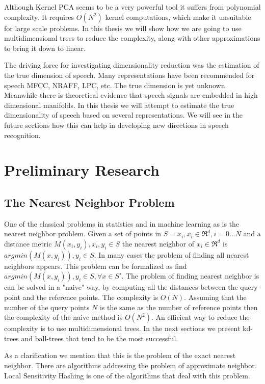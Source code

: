 \documentclass[12pt,letterpaper,doublespaced,ETD,dvips,proposal]{gtthesis}
\begin{document}
\begin{Body}
Although Kernel PCA seems to be a very powerful tool it suffers from
polynomial complexity. It requires $O(N^2)$ kernel computations,
which make it unsuitable for large scale problems. In this thesis we
will show how we are going to use multidimensional trees to reduce
the complexity, along with other approximations to bring it down to
linear.

The driving force for investigating dimensionality reduction was the
estimation of the true dimension of speech. Many representations
have been recommended for speech MFCC, NRAFF, LPC, etc. The true
dimension is yet unknown. Meanwhile there is theoretical evidence
that speech signals are embedded in high dimensional manifolds. In
this thesis we will attempt to estimate the true dimensionality of
speech based on several representations. We will see in the future
sections how this can help in developing new directions in speech
recognition.




\section{Preliminary Research}
\label{prelim}
\subsection{The Nearest Neighbor Problem}
One of the classical problems in statistics and in machine learning
as is the nearest neighbor problem. Given a set of points in $S =
{x_i, x_i\in\Re^d, i=0\dots N}$ and a distance metric $M(x_i, y_i),
x_i, y_i \in S$  the nearest neighbor of $x_i \in \Re^d$ is
$argmin(M(x, y_i)), y_i \in S$. In many cases the problem of finding
all nearest neighbors appears. This problem can be formalized as
find $argmin(M(x, y_i)), y_i \in S, \forall x \in S'$. The problem
of finding nearest neighbor is can be solved in a "naive" way, by
computing all the distances between the query point and the
reference points. The complexity is $O(N)$. Assuming that the number
of the query points $N$ is the same as the number of reference
points then the complexity of the naive method is $O(N^2)$. An
efficient way to reduce the complexity is to use multidimensional
trees. In the next sections we present kd-trees and ball-trees that
tend to be the most successful.

As a clarification we mention that this is the problem of the exact
nearest neighbor. There are algorithms addressing the problem of
approximate neighbor. Local Sensitivity Hashing is one of the
algorithms that deal with this problem.


\end{Body}
\end{document}
